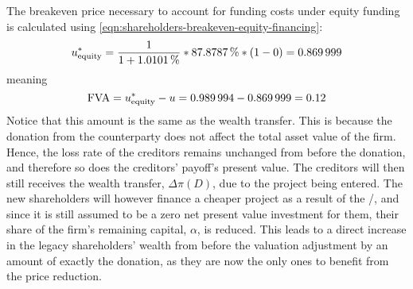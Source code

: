 \documentclass[main.tex]{subfiles}
\begin{document}
        The breakeven price necessary to account for funding costs under equity funding is calculated using
        \cref{eqn:shareholders-breakeven-equity-financing}:
            \begin{equation}
                    u^{\ast}_{\text{equity}} 
                =
                    \frac{1}{1 + \pct{0.010101}} 
                    *
                    \pct{0.878787}
                    *
                    \left(
                        \num{1}
                        -
                        \num{0}
                    \right)
                =
                    \num{0.869999}
            \end{equation}
        meaning 
        \begin{equation}
            \FVA/ = u^{\ast}_{\text{equity}} - u =
            \num{0.989994}-\num{0.869999} =
            \num{0.12}
        \end{equation}
        Notice that this amount is the same as the wealth transfer.
        This is because the donation from the counterparty does not affect the total asset value of the firm.
        Hence, the loss rate of the creditors remains unchanged from before the donation, and therefore so does the creditors' payoff's present value.
        The creditors will then still receives the wealth transfer, $\Delta \pi(D)$,
        due to the project being entered.
        The new shareholders will however finance a cheaper project as a result of the \FVA/, and since it is still assumed to be a zero net present value investment for them, their share of the firm's remaining capital, $\alpha$, is reduced.
        This leads to a direct increase in the legacy shareholders' wealth from before the valuation adjustment by an amount of exactly the donation, as they are now the only ones to benefit from the price reduction. 
\end{document}
